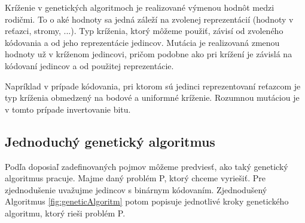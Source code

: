 Kríženie v genetických algoritmoch je realizované výmenou hodnôt medzi rodičmi. To o aké hodnoty sa jedná záleží na zvolenej reprezentácií (hodnoty v reťazci, stromy, ...). Typ kríženia, ktorý môžeme použiť, závisí od zvoleného kódovania a od jeho reprezentácie jedincov. 
Mutácia je realizovaná zmenou hodnoty už v kríženom jedincovi, pričom podobne ako pri krížení je závislá na kódovaní jedincov a od použitej reprezentácie. 

Napríklad v prípade kódovania, pri ktorom sú jedinci reprezentovaní reťazcom je typ kríženia obmedzený na bodové a uniformné kríženie. Rozumnou mutáciou je v tomto prípade invertovanie bitu.

\subsection{Jednoduchý genetický algoritmus}\label{kap2:2.1:2.1.3:SimpleGeneticAlgo}
Podľa doposiaľ zadefinovaných pojmov môžeme predviesť, ako taký genetický algoritmus pracuje. Majme daný problém P, ktorý chceme vyriešiť. Pre zjednodušenie uvažujme jedincov s binárnym kódovaním. Zjednodušený Algoritmus \ref{fig:geneticAlgoritm} potom popisuje jednotlivé kroky genetického algoritmu, ktorý rieši problém P.
